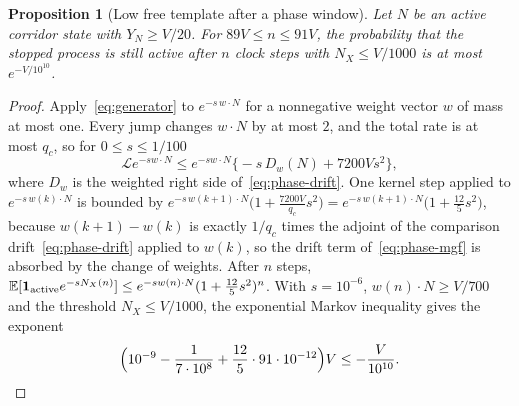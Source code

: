 \documentclass[11pt,a4paper]{article}
\theoremstyle{plain}
\newtheorem{proposition}[theorem]{Proposition}
\theoremstyle{definition}
\theoremstyle{remark}
\newcommand{\E}{\mathbb E}
\newcommand{\Lgen}{\mathcal L}
\newcommand{\one}{\mathbf 1}
\begin{document}
\begin{proposition}[Low free template after a phase window]\label{prop:lowfree}
Let $N$ be an active corridor state with $Y_N\ge V/20$. For $89V\le n\le91V$, the probability that the stopped process is still active after $n$ clock steps with $N_X\le V/1000$ is at most $e^{-V/10^{10}}$.
\end{proposition}
\begin{proof}
Apply~\eqref{eq:generator} to $e^{-s\,w\cdot N}$ for a nonnegative weight vector $w$ of mass at most one. Every jump changes $w\cdot N$ by at most $2$, and the total rate is at most $q_c$, so for $0\le s\le1/100$
\begin{equation}\label{eq:phase-mgf}
\Lgen e^{-sw\cdot N}\le e^{-sw\cdot N}\bigl\{-s\,D_w(N)+7200Vs^2\bigr\},
\end{equation}
where $D_w$ is the weighted right side of~\eqref{eq:phase-drift}. One kernel step applied to $e^{-s\,w(k)\cdot N}$ is bounded by $e^{-s\,w(k+1)\cdot N}\bigl(1+\tfrac{7200V}{q_c}s^2\bigr)=e^{-s\,w(k+1)\cdot N}\bigl(1+\tfrac{12}5s^2\bigr)$, because $w(k+1)-w(k)$ is exactly $1/q_c$ times the adjoint of the comparison drift~\eqref{eq:phase-drift} applied to $w(k)$, so the drift term of~\eqref{eq:phase-mgf} is absorbed by the change of weights. After $n$ steps, $\E[\one_{\rm active}e^{-sN_X(n)}]\le e^{-sw(n)\cdot N}(1+\tfrac{12}5s^2)^n$. With $s=10^{-6}$, $w(n)\cdot N\ge V/700$ and the threshold $N_X\le V/1000$, the exponential Markov inequality gives the exponent
\[
\Bigl(10^{-9}-\frac1{7\cdot10^{8}}+\frac{12}5\cdot91\cdot10^{-12}\Bigr)V\le-\frac V{10^{10}}.\qedhere
\]
\end{proof}
\end{document}
